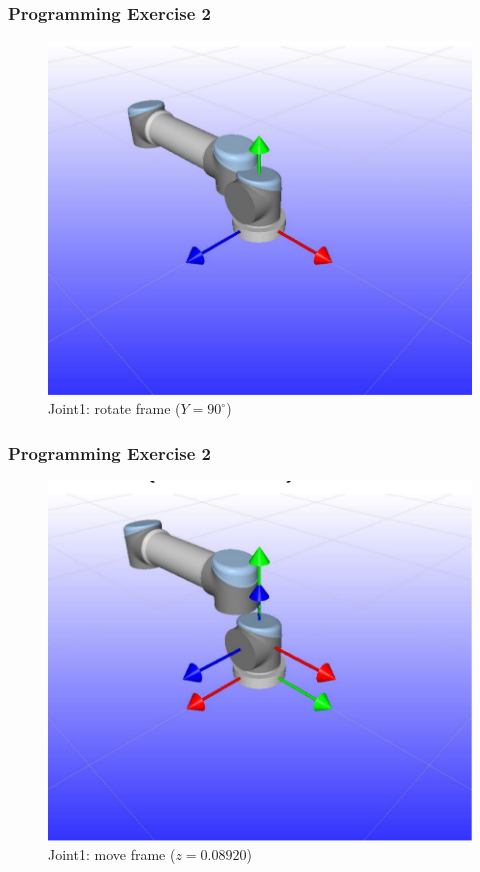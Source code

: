\documentclass{beamer}
\begin{document}

\begin{frame}
  \frametitle{Programming Exercise 2}
  \begin{centering}
    \begin{figure}
    \includegraphics[height=0.6\textheight]{./graphics/ex33_9}
    \caption{Joint1: rotate frame ($Y=90^{\circ}$)}
    \end{figure}
    \end{centering}
  \end{frame}
  

\begin{frame}
  \frametitle{Programming Exercise 2}
  \begin{centering}
    \begin{figure}
    \includegraphics[height=0.6\textheight]{./graphics/ex33_10}
    \caption{Joint1: move frame ($z=0.08920$)}
    \end{figure}
    \end{centering}
  \end{frame}
  
\end{document}
